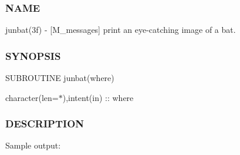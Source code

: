 \subsubsection*{N\+A\+ME}

junbat(3f) -\/ \mbox{[}M\+\_\+messages\mbox{]} print an eye-\/catching image of a bat. 

\subsubsection*{S\+Y\+N\+O\+P\+S\+IS}

S\+U\+B\+R\+O\+U\+T\+I\+NE junbat(where)

character(len=$\ast$),intent(in) \+:\+: where

\subsubsection*{D\+E\+S\+C\+R\+I\+P\+T\+I\+ON}

Sample output\+:

